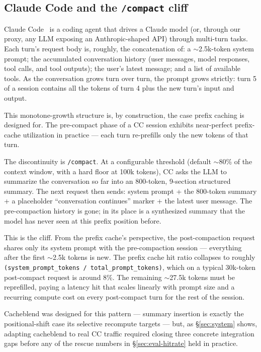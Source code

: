 \subsection{Claude Code and the \texttt{/compact} cliff}
\label{sec:bg-claudecode}

Claude Code~\cite{claude-code} is a coding agent that drives a Claude
model (or, through our proxy, any LLM exposing an Anthropic-shaped
API) through multi-turn tasks. Each turn's request body is, roughly,
the concatenation of: a $\sim$2.5k-token system prompt; the accumulated
conversation history (user messages, model responses, tool calls, and
tool outputs); the user's latest message; and a list of available
tools. As the conversation grows turn over turn, the prompt grows
strictly: turn 5 of a session contains all the tokens of turn 4 plus
the new turn's input and output.

This monotone-growth structure is, by construction, the case prefix
caching is designed for. The pre-compact phase of a CC session
exhibits near-perfect prefix-cache utilization in practice --- each
turn re-prefills only the new tokens of that turn.

The discontinuity is \texttt{/compact}. At a configurable threshold
(default $\sim$80\% of the context window, with a hard floor at 100k
tokens), CC asks the LLM to summarize the conversation so far into an
800-token, 9-section structured summary. The next request then sends:
system prompt + the 800-token summary + a placeholder ``conversation
continues'' marker + the latest user message. The pre-compaction
history is gone; in its place is a synthesized summary that the model
has never seen at this prefix position before.

This is the cliff. From the prefix cache's perspective, the
post-compaction request shares only its system prompt with the
pre-compaction session --- everything after the first $\sim$2.5k
tokens is new. The prefix cache hit ratio collapses to roughly
\texttt{(system\_prompt\_tokens / total\_prompt\_tokens)}, which on
a typical 30k-token post-compact request is around 8\%. The remaining
$\sim$27.5k tokens must be reprefilled, paying a latency hit that
scales linearly with prompt size and a recurring compute cost on every
post-compact turn for the rest of the session.

Cacheblend was designed for this pattern --- summary insertion is
exactly the positional-shift case its selective recompute targets ---
but, as \S\ref{sec:system} shows, adapting cacheblend to real CC
traffic required closing three concrete integration gaps before any
of the rescue numbers in \S\ref{sec:eval-hitrate} held in practice.
